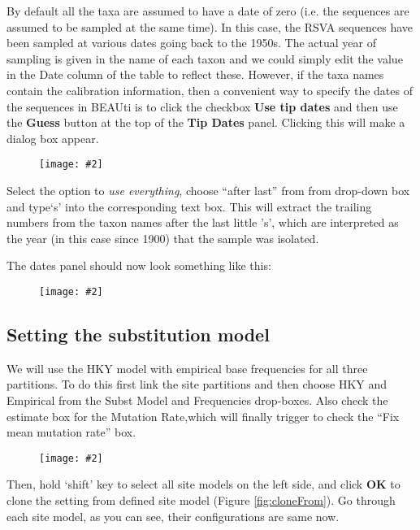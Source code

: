 \documentclass[12pt]{article}
\newcommand{\includeimage}[2][]{%
\texttt{[image: \#2]}
}
\begin{document}
By default all the taxa are assumed to have a date of zero (i.e. the sequences are assumed to be sampled at the same time).
In this case, the RSVA sequences have been sampled at various dates going back to the 1950s. The actual year of sampling
is given in the name of each taxon and we could simply edit the value in the Date column of the table to reflect these.
However, if the taxa names contain the calibration information, then a convenient way to specify the dates of the sequences
in BEAUti is to click the checkbox {\bf Use tip dates} and then use the {\bf Guess} button at the top of the {\bf Tip Dates} panel. Clicking this will make a dialog box appear.

\begin{figure}
\centering	
\includeimage[width=0.6\textwidth]{figures/BEAUti_GuessDates}
\label{fig:BEAUti_GuessDates}
\end{figure}


Select the option to {\it use everything}, choose ``after last'' from from drop-down box and type`s' into the corresponding text box. This will extract the trailing numbers from the taxon names after the last little 's', which are interpreted as the year (in this case since 1900) that the sample was isolated.

The dates panel should now look something like this:

\begin{figure}
\centering	
\includeimage[scale=0.4,clip=true,trim=0 0 0 0]{figures/BEAUti_dates}
\label{fig:BEAUti_dates}
\end{figure}


\subsection*{Setting the substitution model}
We will use the HKY model with empirical base frequencies for all three partitions. To do this first link the site partitions and then choose HKY and Empirical from the Subst Model and Frequencies drop-boxes. Also check the estimate box for the Mutation Rate,which will finally trigger to check the ``Fix mean mutation rate'' box. 

\begin{figure}
\centering	
\includeimage[width=\textwidth]{figures/BEAUti_Site_Model}
\label{fig:BEAUti_Site_Model}
\end{figure}

Then, hold `shift' key to select all site models on the left side, and click \textbf{OK} to clone the setting from defined site model (Figure \ref{fig:cloneFrom}). Go through each site model, as you can see, their configurations are same now. 
\end{document}

